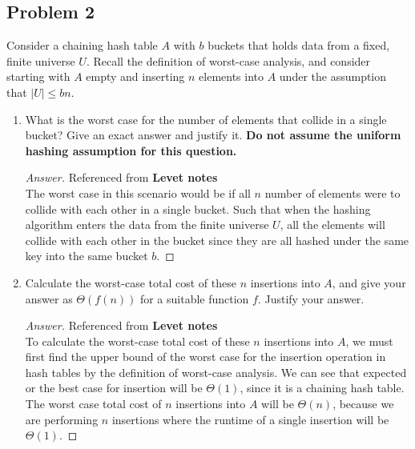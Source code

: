 \documentclass[11pt]{article}
\theoremstyle{definition}
\theoremstyle{definition}
\theoremstyle{definition}
\begin{document}
\newpage
\subsection{Problem 2}
Consider a chaining hash table $A$ with $b$ buckets that holds data from a fixed, finite universe $U$. Recall the definition of worst-case analysis, and consider starting with $A$ empty and inserting $n$ elements into $A$ under the assumption that $|U|\le bn$. 
    
	\begin{enumerate}[label=(\alph*)]
	  \item What is the worst case for the number of elements that collide in a single bucket? Give an exact answer and justify it.     \textbf{Do not assume the uniform hashing assumption for this question.}

    \begin{proof}[Answer] Referenced from \textbf{Levet notes} \\
    The worst case in this scenario would be if all $n$ number of elements were to collide with each other in a single bucket. Such that when the hashing algorithm enters the data from the finite universe $U$, all the elements will collide with each other in the bucket since they are all hashed under the same key into the same bucket $b$.
    \end{proof}

\vfill
	  \item Calculate the worst-case total cost of these $n$ insertions into $A$, and give your answer as $\Theta(f(n))$ for a suitable function $f$. Justify your answer.

    \begin{proof}[Answer] Referenced from \textbf{Levet notes}\\
      To calculate the worst-case total cost of these $n$ insertions into $A$, we must first find the upper bound of the worst case for the insertion operation in hash tables by the definition of worst-case analysis. We can see that expected or the best case for insertion will be $\Theta(1)$, since it is a chaining hash table. The worst case total cost of $n$ insertions into $A$ will be $\Theta(n)$, because we are performing $n$ insertions where the runtime of a single insertion will be $\Theta(1)$.
    \end{proof}
    
    \vfill
	

\end{enumerate}
\end{document}
